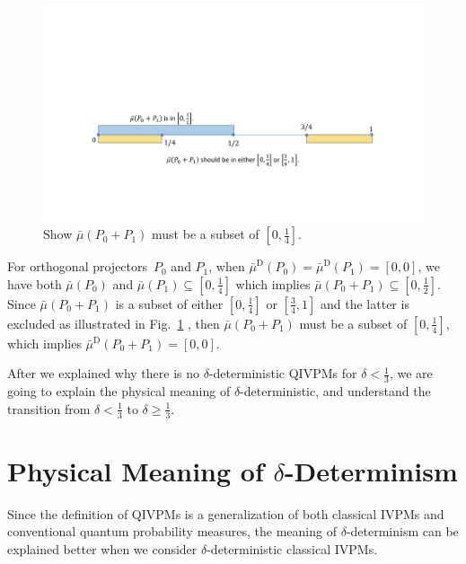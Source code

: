 \documentclass[english,reprint, aps, prl,superscriptaddress, showpacs,
showkeys, longbibliography, amsmath, amssymb, floatfix]{revtex4-1}
\theoremstyle{plain}
\theoremstyle{definition}
\newcommand{\imposs}{\ensuremath{\left[0,0\right]}}
\begin{document}
\begin{figure}
\includegraphics[bb=50bp 100bp 900bp 300bp,clip,scale=0.5]{prop_prop_letter_ajhs_referee_response_pptx}\caption{\label{fig:Show-subset}Show $\bar{\mu}\left(P_{0}+P_{1}\right)$
must be a subset of $\left[0,\frac{1}{4}\right]$.}
\end{figure}
For orthogonal projectors~$P_{0}$ and $P_{1}$, when $\bar{\mu}^{\textrm{D}}\left(P_{0}\right)=\bar{\mu}^{\textrm{D}}\left(P_{1}\right)=\imposs$,
we have both $\bar{\mu}\left(P_{0}\right)$ and $\bar{\mu}\left(P_{1}\right)\subseteq\left[0,\frac{1}{4}\right]$
which implies $\bar{\mu}\left(P_{0}+P_{1}\right)\subseteq\left[0,\frac{1}{2}\right]$.
Since $\bar{\mu}\left(P_{0}+P_{1}\right)$ is a subset of either $\left[0,\frac{1}{4}\right]$
or $\left[\tfrac{3}{4},1\right]$ and the latter is excluded as illustrated
in Fig.~\ref{fig:Show-subset} , then $\bar{\mu}\left(P_{0}+P_{1}\right)$
must be a subset of $\left[0,\frac{1}{4}\right]$, which implies $\bar{\mu}^{\textrm{D}}\left(P_{0}+P_{1}\right)=\imposs$.

After we explained why there is no $\delta$-deterministic QIVPMs
for $\delta<\frac{1}{3}$, we are going to explain the physical meaning
of $\delta$-deterministic, and understand the transition from $\delta<\frac{1}{3}$
to $\delta\ge\frac{1}{3}$.

\section{Physical Meaning of \texorpdfstring{$\delta$}{δ}-Determinism}

Since the definition of QIVPMs is a generalization of both classical
IVPMs and conventional quantum probability measures, the meaning of
$\delta$-determinism can be explained better when we consider $\delta$-deterministic
classical IVPMs.
\end{document}
